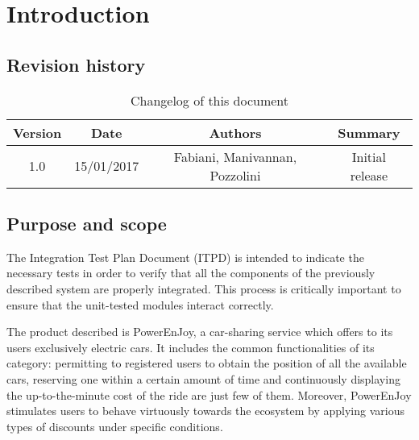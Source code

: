 \chapter{Introduction}

\section{Revision history}
\begin{table}[h]
	\centering
	\begin{tabular}{|c|c|c|c|}
		\hline
		\textbf{Version} & \textbf{Date} & \textbf{Authors} & \textbf{Summary} \\
		\hline
		1.0 & 15/01/2017 & Fabiani, Manivannan, Pozzolini & Initial release  \\
		\hline
	\end{tabular}

	\caption{Changelog of this document}
	\label{tab:revision_history}
\end{table}

\section{Purpose and scope}
The Integration Test Plan Document (ITPD) is intended to indicate the necessary tests in order to verify that all the components of the previously described system are properly integrated. This process is critically important to ensure that the unit-tested modules interact correctly.

The product described is PowerEnJoy, a car-sharing service which offers to its users exclusively electric cars. It includes the common functionalities of its category: permitting to registered users to obtain the position of all the available cars, reserving one within a certain amount of time and continuously displaying the up-to-the-minute cost of the ride are just few of them. Moreover, PowerEnJoy stimulates users to behave virtuously towards the ecosystem by applying various types of discounts under specific conditions.

